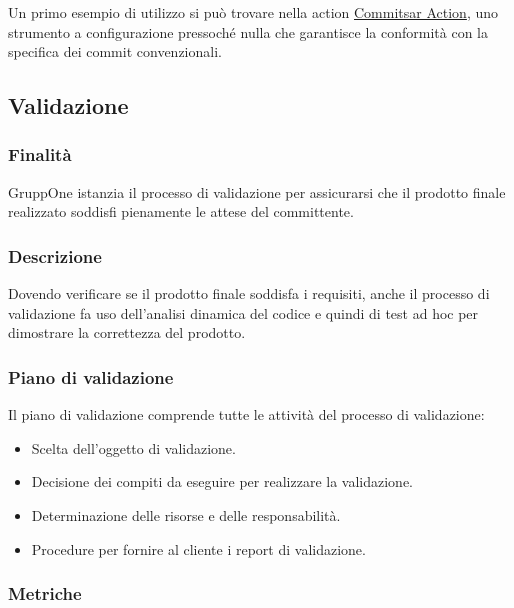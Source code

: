 \documentclass[../norme-di-progetto.tex]{subfiles}
\begin{document}
Un primo esempio di utilizzo si può trovare nella action \href{https://github.com/marketplace/actions/commitsar-action}{Commitsar Action}, uno strumento a configurazione pressoché nulla che garantisce la conformità con la specifica dei commit convenzionali.



\subsection{Validazione}%
\label{sub:validazione}

\subsubsection{Finalità}%
\label{subs:validazione/finalita}

GruppOne istanzia il processo di validazione per assicurarsi che il prodotto finale realizzato soddisfi pienamente le attese del committente.

\subsubsection{Descrizione}%
\label{subs:validazione/descrizione}

Dovendo verificare se il prodotto finale soddisfa i requisiti, anche il processo di validazione fa uso dell'analisi dinamica del codice e quindi di test ad hoc per dimostrare la correttezza del prodotto.

\subsubsection{Piano di validazione}%
\label{subs:piano_di_validazione}

Il piano di validazione comprende tutte le attività del processo di validazione:

\begin{itemize}
  \item Scelta dell'oggetto di validazione.
  \item Decisione dei compiti da eseguire per realizzare la validazione.
  \item Determinazione delle risorse e delle responsabilità.
  \item Procedure per fornire al cliente i report di validazione.
\end{itemize}

\subsubsection{Metriche}%
\label{subs:validazione/metriche}
\end{document}
